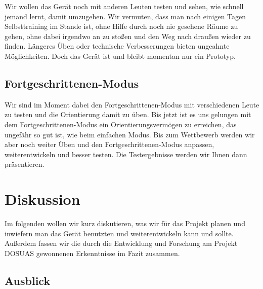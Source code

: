 \documentclass[a4paper,12pt,ngerman]{scrartcl}
\begin{document}
Wir wollen das Gerät noch mit
anderen Leuten testen und sehen, wie schnell jemand lernt, damit umzugehen. Wir vermuten, dass man nach einigen 
Tagen Selbsttraining im Stande ist, ohne Hilfe durch noch nie gesehene Räume zu gehen, ohne dabei irgendwo an zu
stoßen und den Weg nach draußen wieder zu finden. Längeres Üben oder technische Verbesserungen bieten ungeahnte
Möglichkeiten. Doch das Gerät ist und bleibt momentan nur ein Prototyp. 

\subsection{Fortgeschrittenen-Modus}

Wir sind im Moment dabei den Fortgeschrittenen-Modus mit verschiedenen Leute zu testen und die Orientierung damit zu üben. Bis jetzt
ist es uns gelungen mit dem Fortgeschrittenen-Modus ein Orientierungsvermögen zu erreichen, das ungefähr so gut ist, wie beim einfachen
Modus. Bis zum Wettbewerb werden wir aber noch weiter Üben und den Fortgeschrittenen-Modus anpassen, weiterentwickeln und besser testen.
Die Testergebnisse werden wir Ihnen dann präsentieren.

\newpage

\section{Diskussion}

Im folgenden wollen wir kurz diskutieren, was wir für das Projekt planen und inwiefern man das
Gerät benutzten und weiterentwickeln kann und sollte. Außerdem fassen wir die durch die Entwicklung und Forschung am Projekt DOSUAS gewonnenen Erkenntnisse im Fazit zusammen.

\subsection{Ausblick}
\end{document}
